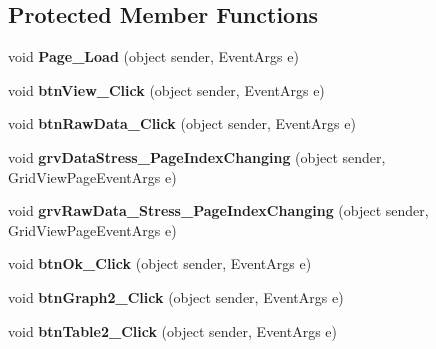 \subsection*{Protected Member Functions}
\begin{DoxyCompactItemize}
\item 
\hypertarget{classusertrackothers__stress_afe1c0c3f23040ca769034ca4a478b968}{void {\bfseries Page\-\_\-\-Load} (object sender, Event\-Args e)}\label{classusertrackothers__stress_afe1c0c3f23040ca769034ca4a478b968}

\item 
\hypertarget{classusertrackothers__stress_adc0c0533c9a81c22b893bc3f6aa25622}{void {\bfseries btn\-View\-\_\-\-Click} (object sender, Event\-Args e)}\label{classusertrackothers__stress_adc0c0533c9a81c22b893bc3f6aa25622}

\item 
\hypertarget{classusertrackothers__stress_aa4b5b9b1617eb405746955a6c687e486}{void {\bfseries btn\-Raw\-Data\-\_\-\-Click} (object sender, Event\-Args e)}\label{classusertrackothers__stress_aa4b5b9b1617eb405746955a6c687e486}

\item 
\hypertarget{classusertrackothers__stress_ad925ee6de0145216def4b36f70afeaca}{void {\bfseries grv\-Data\-Stress\-\_\-\-Page\-Index\-Changing} (object sender, Grid\-View\-Page\-Event\-Args e)}\label{classusertrackothers__stress_ad925ee6de0145216def4b36f70afeaca}

\item 
\hypertarget{classusertrackothers__stress_aa60affd6b0e753ab3eef65ee09d5ea67}{void {\bfseries grv\-Raw\-Data\-\_\-\-Stress\-\_\-\-Page\-Index\-Changing} (object sender, Grid\-View\-Page\-Event\-Args e)}\label{classusertrackothers__stress_aa60affd6b0e753ab3eef65ee09d5ea67}

\item 
\hypertarget{classusertrackothers__stress_a018c7e2eb44204ca1430bf746a59a3fb}{void {\bfseries btn\-Ok\-\_\-\-Click} (object sender, Event\-Args e)}\label{classusertrackothers__stress_a018c7e2eb44204ca1430bf746a59a3fb}

\item 
\hypertarget{classusertrackothers__stress_afbff256155f55b1702ed61ca3a6006fd}{void {\bfseries btn\-Graph2\-\_\-\-Click} (object sender, Event\-Args e)}\label{classusertrackothers__stress_afbff256155f55b1702ed61ca3a6006fd}

\item 
\hypertarget{classusertrackothers__stress_a130028e6b395b202bcc23e294f8fae78}{void {\bfseries btn\-Table2\-\_\-\-Click} (object sender, Event\-Args e)}\label{classusertrackothers__stress_a130028e6b395b202bcc23e294f8fae78}


\end{DoxyCompactItemize}

